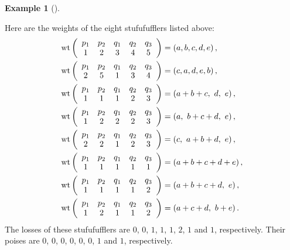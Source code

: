 \documentclass[numbers=enddot,12pt,final,onecolumn,notitlepage]{scrartcl}%
\theoremstyle{definition}
\newtheorem{exam}[theo]{Example}
\newenvironment{example}[1][]
{\begin{exam}[#1]\begin{leftbar}}
{\end{leftbar}\end{exam}}
\begin{document}
\begin{example}
Here are the weights of the eight stufufufflers listed above:%
\begin{align*}
\operatorname*{wt}\left(
\begin{array}
[c]{ccccc}%
p_{1} & p_{2} & q_{1} & q_{2} & q_{3}\\
1 & 2 & 3 & 4 & 5
\end{array}
\right)   &  =\left(  a,b,c,d,e\right)  ,\\
\operatorname*{wt}\left(
\begin{array}
[c]{ccccc}%
p_{1} & p_{2} & q_{1} & q_{2} & q_{3}\\
2 & 5 & 1 & 3 & 4
\end{array}
\right)   &  =\left(  c,a,d,e,b\right)  ,\\
\operatorname*{wt}\left(
\begin{array}
[c]{ccccc}%
p_{1} & p_{2} & q_{1} & q_{2} & q_{3}\\
1 & 1 & 1 & 2 & 3
\end{array}
\right)   &  =\left(  a+b+c,\ d,\ e\right)  ,\\
\operatorname*{wt}\left(
\begin{array}
[c]{ccccc}%
p_{1} & p_{2} & q_{1} & q_{2} & q_{3}\\
1 & 2 & 2 & 2 & 3
\end{array}
\right)   &  =\left(  a,\ b+c+d,\ e\right)  ,\\
\operatorname*{wt}\left(
\begin{array}
[c]{ccccc}%
p_{1} & p_{2} & q_{1} & q_{2} & q_{3}\\
2 & 2 & 1 & 2 & 3
\end{array}
\right)   &  =\left(  c,\ a+b+d,\ e\right)  ,\\
\operatorname*{wt}\left(
\begin{array}
[c]{ccccc}%
p_{1} & p_{2} & q_{1} & q_{2} & q_{3}\\
1 & 1 & 1 & 1 & 1
\end{array}
\right)   &  =\left(  a+b+c+d+e\right)  ,\\
\operatorname*{wt}\left(
\begin{array}
[c]{ccccc}%
p_{1} & p_{2} & q_{1} & q_{2} & q_{3}\\
1 & 1 & 1 & 1 & 2
\end{array}
\right)   &  =\left(  a+b+c+d,\ e\right)  ,\\
\operatorname*{wt}\left(
\begin{array}
[c]{ccccc}%
p_{1} & p_{2} & q_{1} & q_{2} & q_{3}\\
1 & 2 & 1 & 1 & 2
\end{array}
\right)   &  =\left(  a+c+d,\ b+e\right)  .
\end{align*}
The losses of these stufufufflers are $0$, $0$, $1$, $1$, $1$, $2$, $1$ and
$1$, respectively. Their poises are $0$, $0$, $0$, $0$, $0$, $0$, $1$ and $1$, respectively.
\end{example}
\end{document}
